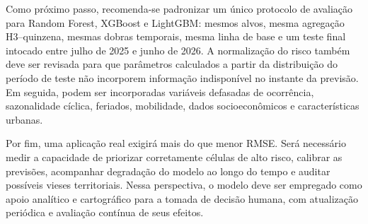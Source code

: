 \documentclass[12pt]{article}
\begin{document}
Como próximo passo, recomenda-se padronizar um único protocolo de avaliação para Random Forest, XGBoost e LightGBM: mesmos alvos, mesma agregação H3--quinzena, mesmas dobras temporais, mesma linha de base e um teste final intocado entre julho de 2025 e junho de 2026. A normalização do risco também deve ser revisada para que parâmetros calculados a partir da distribuição do período de teste não incorporem informação indisponível no instante da previsão. Em seguida, podem ser incorporadas variáveis defasadas de ocorrência, sazonalidade cíclica, feriados, mobilidade, dados socioeconômicos e características urbanas.

Por fim, uma aplicação real exigirá mais do que menor RMSE. Será necessário medir a capacidade de priorizar corretamente células de alto risco, calibrar as previsões, acompanhar degradação do modelo ao longo do tempo e auditar possíveis vieses territoriais. Nessa perspectiva, o modelo deve ser empregado como apoio analítico e cartográfico para a tomada de decisão humana, com atualização periódica e avaliação contínua de seus efeitos.




\end{document}
